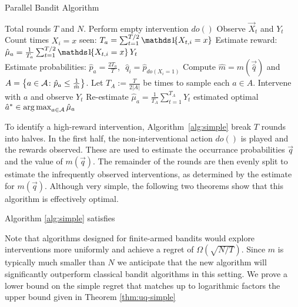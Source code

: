 \begin{algorithm}[h]
\caption{Parallel Bandit Algorithm}\label{alg:simple}
\begin{algorithmic}[1]
 Total rounds $T$ and $N$.
\STATE Perform empty intervention $do()$
\STATE Observe $\vec{X}_t$ and $Y_t$
\ENDFOR
{}
\STATE Count times $X_i = x$ seen: $T_a = \sum_{t=1}^{T/2} \ind{X_{t,i} = x}$
\STATE Estimate reward: $\hat{\mu}_a = \frac{1}{T_a} \sum_{t=1}^{T/2} \ind{X_{t,i} = x} Y_t$ \\[0.2cm]
\STATE Estimate probabilities: $\hat{p}_a = \frac{2 T_a}{T}$,\,\, $\hat q_i = \hat p_{do(X_i = 1)}$
\ENDFOR
\STATE Compute $\hat{m} = m(\vec{\hat q})$ and $A = \left\{a \in \mathcal{A} \colon \hat{p}_a \leq \frac{1}{\hat m}\right\}$.
\STATE Let $T_A := \frac{T}{2 |A|}$ be times to sample each $a\in A$.
\STATE Intervene with $a$ and observe $Y_t$
\ENDFOR
\STATE Re-estimate $\hat{\mu}_a = \frac{1}{T_A} \sum_{t=1}^{T_A} Y_t$
\ENDFOR
\RETURN estimated optimal $\hat{a}^* \in \argmax_{a\in\actions} \hat{\mu}_a$
\end{algorithmic}
\end{algorithm}

To identify a high-reward intervention, Algorithm~\ref{alg:simple} break $T$ rounds into halves. 
In the first half, the non-interventional action $do()$ is played and the rewards observed.
These are used to estimate the occurrance probabilities $\vec{q}$ and the value of $m(\vec{q})$.
The remainder of the rounds are then evenly split to estimate the infrequently observed interventions, as determined by the estimate for $m(\vec{q})$.
Although very simple, the following two theorems show that this algorithm is effectively optimal.

\begin{theorem}\label{thm:uq-simple}
Algorithm \ref{alg:simple} satisfies
\end{theorem}

Note that algorithms designed for finite-armed bandits would explore interventions more uniformly and achieve a regret of $\Omega(\sqrt{N/T})$.
Since $m$ is typically much smaller than $N$ we anticipate that the new algorithm will significantly outperform classical bandit algorithms in
this setting.
We prove a lower bound on the simple regret that matches up to logarithmic factors the upper bound given in Theorem \ref{thm:uq-simple}

